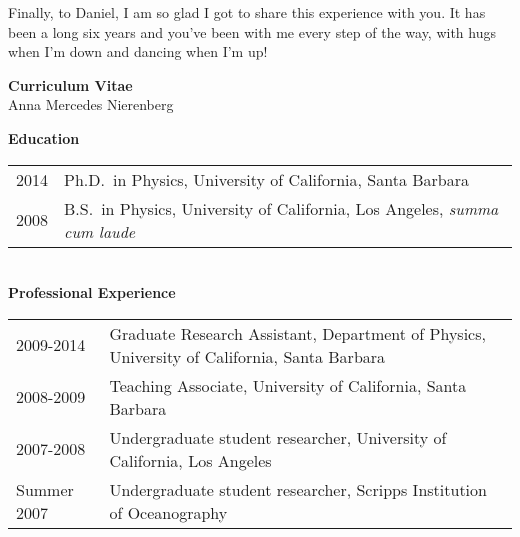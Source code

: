 \documentclass[12pt]{ucthesis}
\begin{document}
\begin{frontmatter}
\begin{acknowledgements}
Finally, to Daniel, I am so glad I got to share this experience with you. It has been a long six years and you've been with me every step of the way, with hugs when I'm down and dancing when I'm up!




\end{acknowledgements}


\newpage

\begin{center}
{\bf \large Curriculum Vitae}\\
{\large Anna Mercedes Nierenberg}
\mbox{ } \\
\end{center}
\begin{flushleft}

{\bf Education}
\smallskip
\begin{tabular}{@{}p{1in}@{}p{4.6in}}
2014 & Ph.D.\ in Physics, University of California, Santa Barbara \\
2008 & B.S.\ in Physics, University of California, Los Angeles, \emph{summa cum laude} \\
\end{tabular}

\mbox{ } \\

{\bf Professional Experience}
\smallskip
\begin{tabular}{@{}p{1in}@{}p{4.6in}}
2009-2014 & Graduate Research Assistant, Department of Physics, University of California, Santa Barbara \\
2008-2009 & Teaching Associate, University of California, Santa Barbara \\
2007-2008 & Undergraduate student researcher, University of California, Los Angeles \\
Summer 2007 & Undergraduate student researcher, Scripps Institution of Oceanography \\

\end{tabular}


\end{flushleft}
\end{frontmatter}
\end{document}
